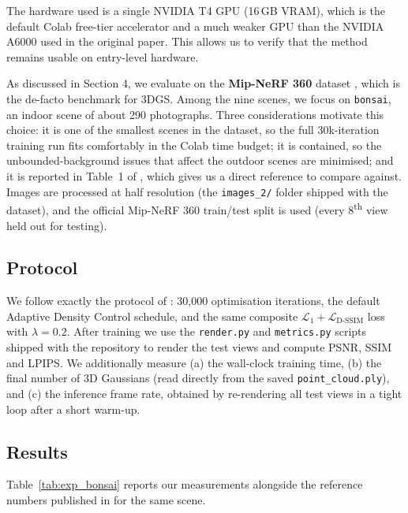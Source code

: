 \documentclass[
	a4paper, %
	10pt, %
	unnumberedsections, %
	twoside, %
]{LTJournalArticle}
\begin{document}
The hardware used is a single NVIDIA T4 GPU (16\,GB VRAM), which is the default Colab free-tier accelerator and a much weaker GPU than the NVIDIA A6000 used in the original paper. This allows us to verify that the method remains usable on entry-level hardware.

As discussed in Section 4, we evaluate on the \textbf{Mip-NeRF 360} dataset \cite{barron2022mipnerf360}, which is the de-facto benchmark for 3DGS. Among the nine scenes, we focus on \texttt{bonsai}, an indoor scene of about 290 photographs. Three considerations motivate this choice: it is one of the smallest scenes in the dataset, so the full 30k-iteration training run fits comfortably in the Colab time budget; it is contained, so the unbounded-background issues that affect the outdoor scenes are minimised; and it is reported in Table~1 of \cite{kerbl20233dgs}, which gives us a direct reference to compare against. Images are processed at half resolution (the \texttt{images\_2/} folder shipped with the dataset), and the official Mip-NeRF 360 train/test split is used (every 8\textsuperscript{th} view held out for testing).

\subsection{Protocol}

We follow exactly the protocol of \cite{kerbl20233dgs}: 30{,}000 optimisation iterations, the default Adaptive Density Control schedule, and the same composite $\mathcal{L}_1 + \mathcal{L}_{\textrm{D-SSIM}}$ loss with $\lambda = 0.2$. After training we use the \texttt{render.py} and \texttt{metrics.py} scripts shipped with the repository to render the test views and compute PSNR, SSIM and LPIPS. We additionally measure (a) the wall-clock training time, (b) the final number of 3D Gaussians (read directly from the saved \texttt{point\_cloud.ply}), and (c) the inference frame rate, obtained by re-rendering all test views in a tight loop after a short warm-up.

\subsection{Results}

Table~\ref{tab:exp_bonsai} reports our measurements alongside the reference numbers published in \cite{kerbl20233dgs} for the same scene.
\end{document}
